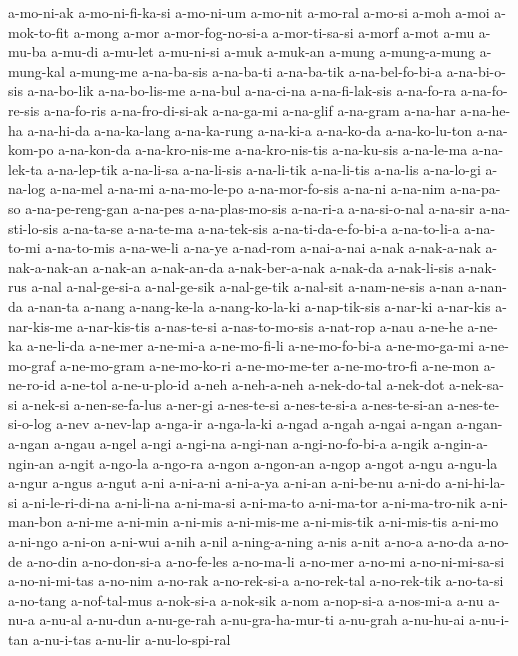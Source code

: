 {a-mo-ni-ak a-mo-ni-fi-ka-si a-mo-ni-um a-mo-nit a-mo-ral a-mo-si a-moh
a-moi a-mok-to-fit a-mong a-mor a-mor-fog-no-si-a a-mor-ti-sa-si a-morf
a-mot a-mu a-mu-ba a-mu-di a-mu-let a-mu-ni-si a-muk a-muk-an a-mung
a-mung-a-mung a-mung-kal a-mung-me a-na-ba-sis a-na-ba-ti a-na-ba-tik
a-na-bel-fo-bi-a a-na-bi-o-sis a-na-bo-lik a-na-bo-lis-me a-na-bul
a-na-ci-na a-na-fi-lak-sis a-na-fo-ra a-na-fo-re-sis a-na-fo-ris
a-na-fro-di-si-ak a-na-ga-mi a-na-glif a-na-gram a-na-har a-na-he-ha
a-na-hi-da a-na-ka-lang a-na-ka-rung a-na-ki-a a-na-ko-da a-na-ko-lu-ton
a-na-kom-po a-na-kon-da a-na-kro-nis-me a-na-kro-nis-tis a-na-ku-sis
a-na-le-ma a-na-lek-ta a-na-lep-tik a-na-li-sa a-na-li-sis a-na-li-tik
a-na-li-tis a-na-lis a-na-lo-gi a-na-log a-na-mel a-na-mi a-na-mo-le-po
a-na-mor-fo-sis a-na-ni a-na-nim a-na-pa-so a-na-pe-reng-gan a-na-pes
a-na-plas-mo-sis a-na-ri-a a-na-si-o-nal a-na-sir a-na-sti-lo-sis
a-na-ta-se a-na-te-ma a-na-tek-sis a-na-ti-da-e-fo-bi-a a-na-to-li-a
a-na-to-mi a-na-to-mis a-na-we-li a-na-ye a-nad-rom a-nai-a-nai a-nak
a-nak-a-nak a-nak-a-nak-an a-nak-an a-nak-an-da a-nak-ber-a-nak a-nak-da
a-nak-li-sis a-nak-rus a-nal a-nal-ge-si-a a-nal-ge-sik a-nal-ge-tik
a-nal-sit a-nam-ne-sis a-nan a-nan-da a-nan-ta a-nang a-nang-ke-la
a-nang-ko-la-ki a-nap-tik-sis a-nar-ki a-nar-kis a-nar-kis-me
a-nar-kis-tis a-nas-te-si a-nas-to-mo-sis a-nat-rop a-nau a-ne-he a-ne-ka
a-ne-li-da a-ne-mer a-ne-mi-a a-ne-mo-fi-li a-ne-mo-fo-bi-a a-ne-mo-ga-mi
a-ne-mo-graf a-ne-mo-gram a-ne-mo-ko-ri a-ne-mo-me-ter a-ne-mo-tro-fi
a-ne-mon a-ne-ro-id a-ne-tol a-ne-u-plo-id a-neh a-neh-a-neh a-nek-do-tal
a-nek-dot a-nek-sa-si a-nek-si a-nen-se-fa-lus a-ner-gi a-nes-te-si
a-nes-te-si-a a-nes-te-si-an a-nes-te-si-o-log a-nev a-nev-lap a-nga-ir
a-nga-la-ki a-ngad a-ngah a-ngai a-ngan a-ngan-a-ngan a-ngau a-ngel a-ngi
a-ngi-na a-ngi-nan a-ngi-no-fo-bi-a a-ngik a-ngin-a-ngin-an a-ngit
a-ngo-la a-ngo-ra a-ngon a-ngon-an a-ngop a-ngot a-ngu a-ngu-la a-ngur
a-ngus a-ngut a-ni a-ni-a-ni a-ni-a-ya a-ni-an a-ni-be-nu a-ni-do
a-ni-hi-la-si a-ni-le-ri-di-na a-ni-li-na a-ni-ma-si a-ni-ma-to
a-ni-ma-tor a-ni-ma-tro-nik a-ni-man-bon a-ni-me a-ni-min a-ni-mis
a-ni-mis-me a-ni-mis-tik a-ni-mis-tis a-ni-mo a-ni-ngo a-ni-on a-ni-wui
a-nih a-nil a-ning-a-ning a-nis a-nit a-no-a a-no-da a-no-de a-no-din
a-no-don-si-a a-no-fe-les a-no-ma-li a-no-mer a-no-mi a-no-ni-mi-sa-si
a-no-ni-mi-tas a-no-nim a-no-rak a-no-rek-si-a a-no-rek-tal a-no-rek-tik
a-no-ta-si a-no-tang a-nof-tal-mus a-nok-si-a a-nok-sik a-nom a-nop-si-a
a-nos-mi-a a-nu a-nu-a a-nu-al a-nu-dun a-nu-ge-rah a-nu-gra-ha-mur-ti
a-nu-grah a-nu-hu-ai a-nu-i-tan a-nu-i-tas a-nu-lir a-nu-lo-spi-ral
}
